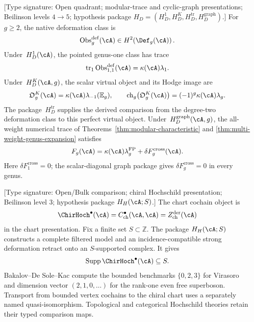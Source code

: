 \begin{theorem}
\label{thm:theorem-d-platonic-pointer}
\ClaimStatusConditional
\textup{[Type signature: Open quadrant; modular-trace and cyclic-graph
presentations; Beilinson levels \(4\to5\); hypothesis package
\(H_D=(H_D^1,H_D^K,H_D^{\mathrm{tr}},H_D^{\mathrm{graph}})\).]}
For \(g\geq2\), the native deformation class is
\[
 \operatorname{Obs}^{\mathrm{def}}_g(\cA)
 \in H^2\!\left(\Def_g(\cA)\right).
\]
Under~\(H_D^1(\cA)\), the pointed genus-one class has trace
\[
 \operatorname{tr}_1\operatorname{Obs}^{\mathrm{def}}_{1,1}(\cA)
 =\kappa(\cA)\lambda_1.
\]
Under~\(H_D^K(\cA,g)\), the scalar virtual object and its Hodge
image are
\[
 \mathfrak O_g^K(\cA)=\kappa(\cA)\lambda_{-1}(\mathbb E_g),
 \qquad
 \operatorname{ch}_g\!\left(\mathfrak O_g^K(\cA)\right)
 =(-1)^g\kappa(\cA)\lambda_g.
\]
The package~\(H_D^{\mathrm{tr}}\) supplies the derived comparison
from the degree-two deformation class to this perfect virtual object.
Under~\(H_D^{\mathrm{graph}}(\cA,g)\), the all-weight numerical trace of
Theorems~\ref{thm:modular-characteristic} and
\ref{thm:multi-weight-genus-expansion} satisfies
\[
 F_g(\cA)
 =
 \kappa(\cA)\lambda_g^{\mathrm{FP}}
 +
 \delta F_g^{\mathrm{cross}}(\cA).
\]
Here \(\delta F_1^{\mathrm{cross}}=0\); the scalar-diagonal graph
package gives \(\delta F_g^{\mathrm{cross}}=0\) in every genus.
\end{theorem}

\begin{theorem}
\label{thm:theorem-h-platonic-pointer}
\ClaimStatusConditional
\textup{[Type signature: Open/Bulk comparison; chiral Hochschild
presentation; Beilinson level \(3\); hypothesis package
\(H_H(\cA;S)\).]}
The chart cochain object is
\[
 \ChirHoch^\bullet(\cA)
 =
 C^\bullet_{\mathrm{ch}}(\cA,\cA)
 =
 Z^{\mathrm{der}}_{\mathrm{ch}}(\cA)
\]
in the chart presentation.  Fix a finite set $S\subset\mathbb Z$.
The package $H_H(\cA;S)$ constructs a complete filtered model and an
incidence-compatible strong deformation retract onto an
$S$-supported complex.  It gives
\[
 \operatorname{Supp}\ChirHoch^\bullet(\cA)\subseteq S.
\]
Bakalov--De Sole--Kac compute the bounded benchmarks
$\{0,2,3\}$ for Virasoro and dimension vector $(2,1,0,\ldots)$ for
the rank-one even free superboson.  Transport from bounded vertex
cochains to the chiral chart uses a separately named quasi-isomorphism.
Topological and categorical Hochschild theories retain their typed
comparison maps.
\end{theorem}

